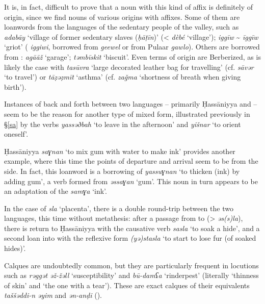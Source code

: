\documentclass[output=paper]{langsci/langscibook}
\begin{document}
It is, in fact, difficult to prove that a noun with this kind of affix is definitely of  origin, since we find nouns of various origins with  affixes. Some of them are {loanwords} from the languages of the sedentary people of the valley, such as \textit{adabāy} ‘village of former sedentary slaves (\textit{ḥ{\R}āṭīn})’ (<  \textit{dèbé} ‘village’); \textit{iggīw} \~{} \textit{īggīw} ‘griot’ ( \textit{iggiwi}, borrowed from  \textit{geewel} or from Pulaar \textit{gawlo}). Others are borrowed from : \textit{agā{\R}āž} ‘garage’; \textit{təmbīskit} ‘biscuit’. Even terms of  origin are Berberized, as is likely the case with \textit{tasūvra} ‘large decorated leather bag for travelling’ (cf. \textit{sāvər} ‘to travel’) or \textit{tāẓəẓmīt} ‘asthma’ (cf.  \textit{zaǧma} ‘shortness of breath when giving birth’).


Instances of back and forth between two languages – primarily Ḥassāniyya and  – seem to be the reason for another type of mixed form, illustrated previously in §\ref{sa} by the  verbs \textit{yassəðbah} ‘to leave in the afternoon’ and \textit{yišnar} ‘to orient oneself’.

Ḥassāniyya \textit{saɣnan} ‘to mix gum with water to make ink’ provides another example, where this time the points of departure and arrival seem to be from the  side. In fact, this {loanword} is a borrowing of  \textit{yassuɣnan} ‘to thicken (ink) by adding gum’, a verb formed from \textit{əssaɣan} ‘gum’. This noun in turn appears to be an adaptation of the  \textit{samɣa} ‘ink’. 

In the case of \textit{sla} ‘placenta’, there is a double round-trip between the two languages, this time without metathesis: after a passage from  to  (> \textit{əs(s)la}), there is return to Ḥassāniyya with the {causative} verb \textit{sasla} ‘to soak a hide’, and a second loan into  with the reflexive form \textit{(yə)stasla} ‘to start to lose fur (of soaked hides)’.


Calques are undoubtedly common, but they are particularly frequent in locutions such as \textit{rəggət} \textit{əž-žəll} ‘susceptibility’ and \textit{bū-damʕa} ‘rinderpest’ (literally ‘thinness of skin’ and ‘the one with a tear’). These are exact calques of their  equivalents \textit{taššəddi-n} \textit{əyim} and \textit{ən-anḍi} (\citealt{Taine-Cheikh2008chapter}).
\end{document}
